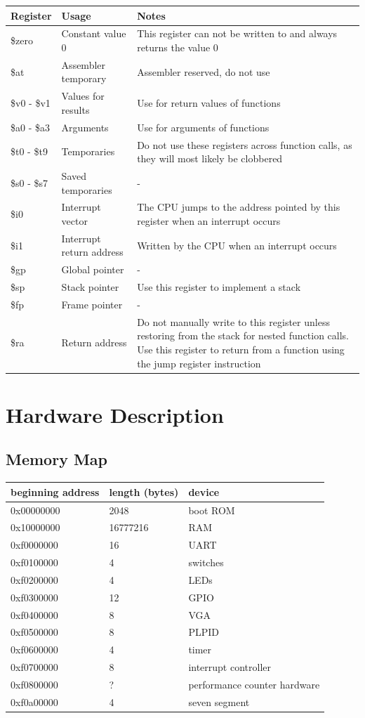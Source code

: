 \documentclass{article}
\begin{document}
\begin{tabular}{| l | l | p{8cm} |}
\hline
Register & Usage & Notes \\
\hline
\$zero	& Constant value 0 & This register can not be written to and always returns the value 0 \\
\$at	& Assembler temporary &	Assembler reserved, do not use \\
\$v0 - \$v1 &	Values for results &	Use for return values of functions \\
\$a0 - \$a3 &	Arguments &	Use for arguments of functions \\
\$t0 - \$t9 &	Temporaries &	Do not use these registers across function calls, as they will most likely be clobbered \\
\$s0 - \$s7 &	Saved temporaries &	- \\
\$i0 &	Interrupt vector &	The CPU jumps to the address pointed by this register when an interrupt occurs \\
\$i1 &	Interrupt return address &	Written by the CPU when an interrupt occurs \\
\$gp &	Global pointer &	- \\
\$sp &	Stack pointer &	Use this register to implement a stack \\
\$fp &	Frame pointer & - \\
\$ra &	Return address & Do not manually write to this register unless restoring from the stack for nested function calls. Use this register to return from a function using the jump register instruction \\
\hline
\end{tabular}

\section{Hardware Description}
\subsection{Memory Map}
\begin{tabular}{| l | l | l |}
\hline
\textbf{beginning address} & \textbf{length (bytes)} & device \\
\hline
0x00000000 & 2048 & boot ROM \\
0x10000000 & 16777216 & RAM \\
0xf0000000 & 16 & UART \\
0xf0100000 & 4 & switches \\
0xf0200000 & 4 & LEDs \\
0xf0300000 & 12 & GPIO \\
0xf0400000 & 8 & VGA \\
0xf0500000 & 8 & PLPID \\
0xf0600000 & 4 & timer \\
0xf0700000 & 8 & interrupt controller \\
0xf0800000 & ? & performance counter hardware \\
0xf0a00000 & 4 & seven segment \\
\hline
\end{tabular}
\end{document}
